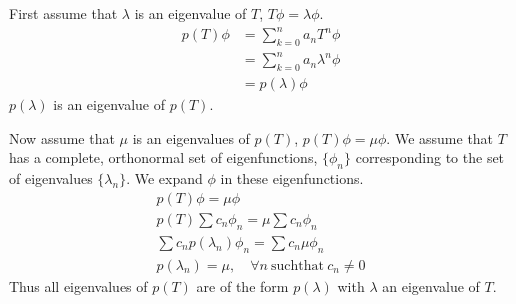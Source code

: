 \begin{Solution}
  First assume that $\lambda$ is an eigenvalue of $T$, $T \phi = \lambda \phi$.
  \begin{align*}
    p(T) \phi
    &= \sum_{k = 0}^n a_n T^n \phi \\
    &= \sum_{k = 0}^n a_n \lambda^n \phi \\
    &= p(\lambda) \phi
  \end{align*}
  $p(\lambda)$ is an eigenvalue of $p(T)$.

  Now assume that $\mu$ is an eigenvalues of $p(T)$, $p(T) \phi = \mu \phi$.
  We assume that $T$ has a complete, orthonormal set of eigenfunctions, 
  $\{ \phi_n \}$ corresponding to the set of eigenvalues $\{\lambda_n\}$.  
  We expand $\phi$ in these eigenfunctions.
  \begin{gather*}
    p(T) \phi = \mu \phi \\
    p(T) \sum c_n \phi_n = \mu \sum c_n \phi_n \\
    \sum c_n p(\lambda_n) \phi_n = \sum c_n \mu \phi_n \\
    p(\lambda_n) = \mu, \quad \forall n\ \mathrm{such that}\ c_n \neq 0
  \end{gather*}
  Thus all eigenvalues of $p(T)$ are of the form $p(\lambda)$ with $\lambda$
  an eigenvalue of $T$.
\end{Solution}



